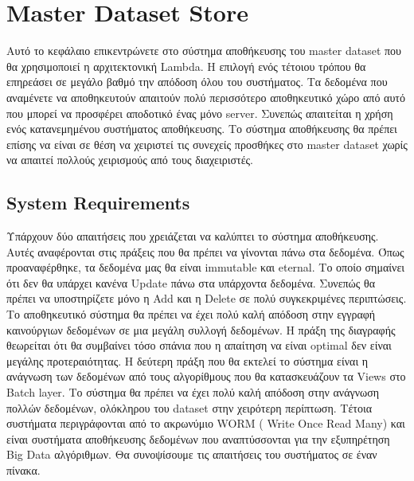 \chapter{Master Dataset Store}

Αυτό το κεφάλαιο επικεντρώνετε στο σύστημα αποθήκευσης του master dataset που θα χρησιμοποιεί η αρχιτεκτονική Lambda. Η επιλογή ενός τέτοιου τρόπου θα επηρεάσει σε μεγάλο βαθμό την απόδοση όλου του συστήματος. Τα δεδομένα που αναμένετε να αποθηκευτούν απαιτούν πολύ περισσότερο αποθηκευτικό χώρο από αυτό που μπορεί να προσφέρει αποδοτικό ένας μόνο server. Συνεπώς απαιτείται η χρήση ενός κατανεμημένου συστήματος αποθήκευσης. Το σύστημα αποθήκευσης θα πρέπει επίσης να είναι σε θέση να χειριστεί τις συνεχείς προσθήκες στο master dataset χωρίς να απαιτεί πολλούς χειρισμούς από τους διαχειριστές.

\vspace{60mm}

\section{System Requirements}
Υπάρχουν δύο απαιτήσεις που χρειάζεται να καλύπτει το σύστημα αποθήκευσης. Αυτές αναφέρονται στις πράξεις που θα πρέπει να γίνονται πάνω στα δεδομένα. 
Όπως προαναφέρθηκε, τα δεδομένα μας θα είναι immutable και eternal. Το οποίο σημαίνει ότι δεν θα υπάρχει κανένα Update πάνω στα υπάρχοντα δεδομένα. Συνεπώς θα πρέπει να υποστηρίζετε μόνο η Add και η Delete σε πολύ συγκεκριμένες περιπτώσεις. Το αποθηκευτικό σύστημα θα πρέπει να έχει πολύ καλή απόδοση στην εγγραφή καινούργιων δεδομένων σε μια μεγάλη συλλογή δεδομένων. Η πράξη της διαγραφής θεωρείται ότι θα συμβαίνει τόσο σπάνια που η απαίτηση να είναι optimal δεν είναι μεγάλης προτεραιότητας.
\newline  
Η δεύτερη πράξη που θα εκτελεί το σύστημα είναι η ανάγνωση των δεδομένων από τους αλγορίθμους που θα κατασκευάζουν τα Views στο Batch layer. Το σύστημα θα πρέπει να έχει πολύ καλή απόδοση στην ανάγνωση πολλών δεδομένων, ολόκληρου του dataset στην χειρότερη περίπτωση.
Τέτοια συστήματα περιγράφονται από το ακρωνύμιο WORM ( Write Once Read Many) και είναι συστήματα αποθήκευσης δεδομένων που αναπτύσσονται για την εξυπηρέτηση Big Data αλγόριθμων.
\newline
Θα συνοψίσουμε τις απαιτήσεις του συστήματος σε έναν πίνακα.

